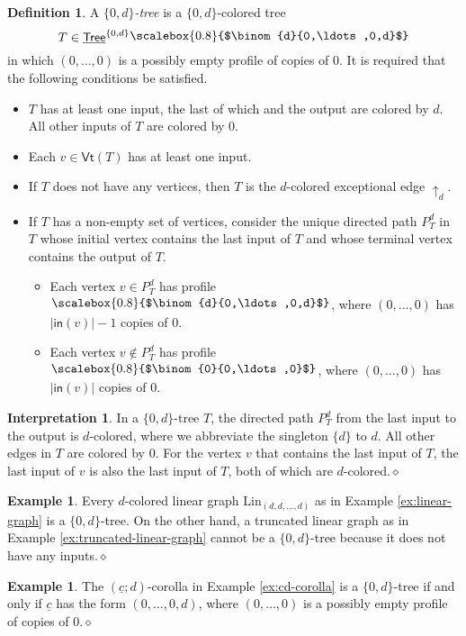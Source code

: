 \documentclass[11pt]{amsbook}
\numberwithin{section}{chapter}
\numberwithin{subsection}{section}
\numberwithin{equation}{section}
\theoremstyle{plain}
\theoremstyle{definition}
\newtheorem{definition}[equation]{Definition}
\newtheorem{example}[equation]{Example}
\newtheorem{interpretation}[equation]{Interpretation}
\newcommand{\Lin}{\mathrm{Lin}}
\newcommand{\Vt}{\mathsf{Vt}}
\newcommand{\zerod}{\{0,d\}}
\newcommand{\dqed}{\hfill$\diamond$}
\newcommand{\Tree}{\mathsf{Tree}}
\newcommand{\uTree}{\underline{\Tree}}
\newcommand{\uTreezerod}{\uTree^{\zerod}}
\newcommand{\uc}{\underline c}
\newcommand{\smallprof}[1]
{\raisebox{.05cm}{\scalebox{0.8}{#1}}}
\newcommand{\dzerozerod}{\smallprof{$\binom{d}{0,\ldots,0,d}$}}
\newcommand{\zerozerozero}{\smallprof{$\binom{0}{0,\ldots,0}$}}
\newcommand{\inp}{\mathsf{in}}
\begin{document}
\begin{definition}\label{def:painted-tree}
A \index{tree!$\zerod$-}\emph{$\zerod$-tree} is a $\zerod$-colored tree \[T \in \uTreezerod\dzerozerod\] in which $(0,\ldots,0)$ is a possibly empty profile of copies of $0$.  It is required that the following conditions be satisfied. 
\begin{itemize}\item $T$ has at least one input, the last of which and the output are colored by $d$.  All other inputs of $T$ are colored by $0$.
\item Each $v \in \Vt(T)$ has at least one input.
\item If $T$ does not have any vertices, then $T$ is the $d$-colored exceptional edge $\uparrow_d$.
\item If $T$ has a non-empty set of vertices, consider the unique directed path $P^d_T$ in $T$ whose initial vertex contains the last input of $T$ and whose terminal vertex contains the output of $T$. 
\begin{itemize}\item Each vertex $v \in P^d_T$ has profile $\dzerozerod$, where $(0,\ldots,0)$ has $|\inp(v)|-1$ copies of $0$.
\item Each vertex $v\not\in P^d_T$ has profile $\zerozerozero$, where $(0,\ldots,0)$ has $|\inp(v)|$ copies of $0$.
\end{itemize}
\end{itemize}
\end{definition}

\begin{interpretation} In a $\zerod$-tree $T$, the directed path $P^d_T$ from the last input to the output is $d$-colored, where we abbreviate the singleton $\{d\}$ to $d$.  All other edges in $T$ are colored by $0$.  For the vertex $v$ that contains the last input of $T$, the last input of $v$ is also the last input of $T$, both of which are $d$-colored.\dqed
\end{interpretation}

\begin{example} Every $d$-colored linear graph $\Lin_{(d,d,\ldots,d)}$ as in Example \ref{ex:linear-graph} is a $\zerod$-tree.  On the other hand, a truncated linear graph as in Example \ref{ex:truncated-linear-graph} cannot be a $\zerod$-tree because it does not have any inputs.\dqed\end{example}

\begin{example} The $(\uc;d)$-corolla in Example \ref{ex:cd-corolla} is a $\zerod$-tree if and only if $\uc$ has the form $(0,\ldots,0,d)$, where $(0,\ldots,0)$ is a possibly empty profile of copies of $0$.\dqed\end{example}
\end{document}
